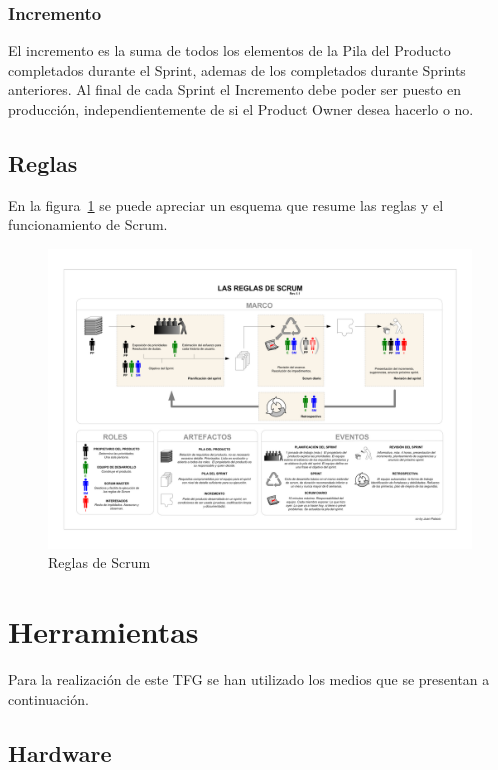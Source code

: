 \subsubsection{Incremento}

El incremento es la suma de todos los elementos de la Pila del Producto completados durante el Sprint, ademas
de los completados durante Sprints anteriores. Al final de cada Sprint el Incremento debe poder ser puesto en 
producción, independientemente de si el Product Owner desea hacerlo o no.

\subsection{Reglas}

En la figura~\ref{fig:scrum} se puede apreciar un esquema que resume las reglas y el funcionamiento de Scrum.

\begin{figure}[!h]
	\begin{center}
		\includegraphics[width=1.2\textwidth]{./img/scrum.png}
		\caption{Reglas de Scrum}
		\label{fig:scrum}
	\end{center}
\end{figure}

\section{Herramientas}

Para la realización de este \acs{TFG} se han utilizado los medios que se presentan a continuación.

\subsection{Hardware}

